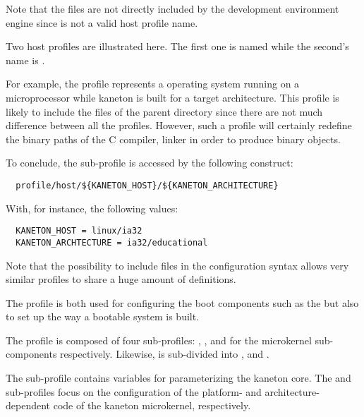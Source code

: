 Note that the files  are not directly included by the
development environment engine since  is not a valid host
profile name.

Two host profiles are illustrated here. The first one is named
 while the second's name is .

For example, the   profile represents a
 operating system running on a 
microprocessor while kaneton is built for a  target
architecture. This profile is likely to include the  files
of the parent directory since there are not much difference between all the
  profiles. However, such a profile will
certainly redefine the binary paths of the C compiler, linker \etc{} in order
to produce  binary objects.

To conclude, the  sub-profile is accessed by the following
construct:

\begin{verbatim}
  profile/host/${KANETON_HOST}/${KANETON_ARCHITECTURE}
\end{verbatim}

With, for instance, the following values:

\begin{verbatim}
  KANETON_HOST = linux/ia32
  KANETON_ARCHTECTURE = ia32/educational
\end{verbatim}

Note that the possibility to include files in the configuration syntax allows
very similar profiles to share a huge amount of definitions.



The  profile is both used for configuring the boot components
such as the  \etc{} but also to set up the way a bootable
system is built.



The  profile is composed of four sub-profiles: ,
,  and  for the 
microkernel sub-components respectively. Likewise,  is
sub-divided into ,  and .

The  sub-profile contains variables for parameterizing the
kaneton core. The  and  sub-profiles
focus on the configuration of the platform- and architecture-dependent code
of the kaneton microkernel, respectively.

